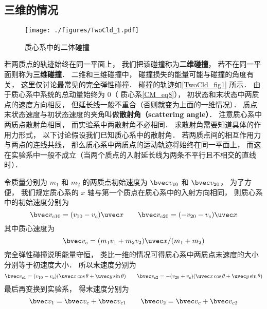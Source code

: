 \subsection{三维的情况}

\begin{figure}[ht]
\centering
\texttt{[image: ./figures/TwoCld\_1.pdf]}
\caption{质心系中的二体碰撞} \label{TwoCld_fig1}
\end{figure}

若两质点的轨迹始终在同一平面上， 我们把该碰撞称为\textbf{二维碰撞}， 若不在同一平面则称为\textbf{三维碰撞}． 二维和三维碰撞中， 碰撞损失的能量可能与碰撞的角度有关， 这里仅讨论最常见的完全弹性碰撞．
碰撞的轨迹如\autoref{TwoCld_fig1} 所示． 由于质心系中系统的总动量始终为 0（ 质心系\autoref{CM_eq8}），  初状态和末状态中两质点的速度方向相反， 但延长线一般不重合（否则就变为上面的一维情况）． 质点末状态速度与初状态速度的夹角叫做\textbf{散射角（scattering angle）}． 注意质心系中两质点散射角相同， 而实验系中两散射角不必相同． 求散射角需要知道具体的作用力形式， 以下讨论假设我们已知质心系中的散射角．%
若两质点间的相互作用力与两点的连线共线， 那么质心系中两质点的运动轨迹将始终在同一平面上， 而这在实验系中一般不成立（当两个质点的入射延长线为两条不平行且不相交的直线时）．

令质量分别为 $m_1$ 和 $m_2$ 的两质点初始速度为 $\bvec v_{10}$ 和 $\bvec v_{20}$， 为了方便， 我们规定质心系的 $x$ 轴与第一个质点在质心系中的入射方向相同， 则质心系中的初始速度分别为
\begin{equation}
\bvec v_{c10} = (v_{10} - v_c)\uvec x \qquad \bvec v_{c20} = (-v_{20} - v_c) \uvec x
\end{equation}
其中质心速度为
\begin{equation}
\bvec v_c = (m_1 v_1 + m_2 v_2)\uvec x/(m_1 + m_2)
\end{equation}
完全弹性碰撞说明能量守恒， 类比一维的情况可得质心系中两质点末速度的大小分别等于初速度大小． 所以末速度分别为
\begin{equation}
\bvec v_{c1} = (v_{10} - v_c)(\uvec x\cos\theta + \uvec y\sin\theta) \qquad
\bvec v_{c2} = -(v_{20} + v_c)(\uvec x\cos\theta + \uvec y\sin\theta)
\end{equation}
最后再变换到实验系， 得末速度分别为
\begin{equation}
\bvec v_1 = \bvec v_c + \bvec v_{c1} \qquad
\bvec v_2 = \bvec v_c + \bvec v_{c2}
\end{equation}

